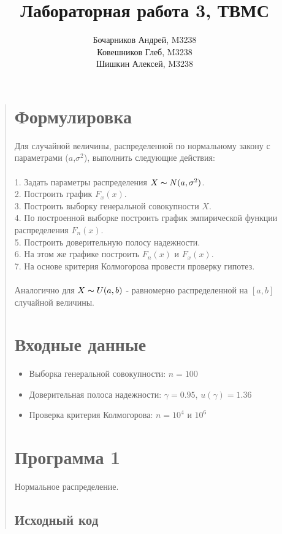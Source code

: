\documentclass{article}
\begin{document}
\title{Лабораторная работа 3, ТВМС}
\author{
	Бочарников Андрей, M3238\\
	Ковешников Глеб, M3238\\
	Шишкин Алексей, M3238
}
\maketitle

\begin{quote}
\section{Формулировка}
	Для случайной величины, распределенной по нормальному закону с параметрами ($a$,$\sigma^2$), выполнить следующие действия:\\\\
	1. Задать параметры распределения $X \thicksim N(a, \sigma^2)$.\\
	2. Построить график $F_x(x)$.\\
	3. Построить выборку генеральной совокупности $X$.\\
	4. По построенной выборке построить график эмпирической функции распределения $F_n(x)$.\\
	5. Построить доверительную полосу надежности.\\
	6. На этом же графике построить $F_n(x)$ и $F_x(x)$.\\
	7. На основе критерия Колмогорова провести проверку гипотез.\\\\
	Аналогично для $X \thicksim U(a, b)$ - равномерно распределенной на $[a, b]$ случайной величины.
\section{Входные данные}
        \begin{itemize}
            \item Выборка генеральной совокупности: $n = 100$
	    \item Доверительная полоса надежности: $\gamma = 0.95$, $u(\gamma) = 1.36$
            \item Проверка критерия Колмогорова: $n = 10^4$ и $10^6$
        \end{itemize}
\section{Программа 1}
	Нормальное распределение.
\subsection{Исходный код}
        \begin{minipage}{\linewidth}
            
        \end{minipage}

\end{quote}
\end{document}
